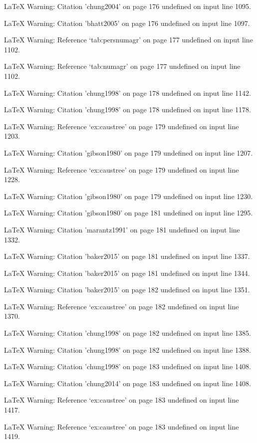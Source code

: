 LaTeX Warning: Citation 'chung2004' on page 176 undefined on input line 1095.


LaTeX Warning: Citation 'bhatt2005' on page 176 undefined on input line 1097.


LaTeX Warning: Reference `tab:persnumagr' on page 177 undefined on input line 1102.


LaTeX Warning: Reference `tab:numagr' on page 177 undefined on input line 1102.


LaTeX Warning: Citation 'chung1998' on page 178 undefined on input line 1142.


LaTeX Warning: Citation 'chung1998' on page 178 undefined on input line 1178.


LaTeX Warning: Reference `ex:caustree' on page 179 undefined on input line 1203.


LaTeX Warning: Citation 'gibson1980' on page 179 undefined on input line 1207.


LaTeX Warning: Reference `ex:caustree' on page 179 undefined on input line 1228.


LaTeX Warning: Citation 'gibson1980' on page 179 undefined on input line 1230.


LaTeX Warning: Citation 'gibson1980' on page 181 undefined on input line 1295.


LaTeX Warning: Citation 'marantz1991' on page 181 undefined on input line 1332.


LaTeX Warning: Citation 'baker2015' on page 181 undefined on input line 1337.


LaTeX Warning: Citation 'baker2015' on page 181 undefined on input line 1344.


LaTeX Warning: Citation 'baker2015' on page 182 undefined on input line 1351.


LaTeX Warning: Reference `ex:caustree' on page 182 undefined on input line 1370.


LaTeX Warning: Citation 'chung1998' on page 182 undefined on input line 1385.


LaTeX Warning: Citation 'chung1998' on page 182 undefined on input line 1388.


LaTeX Warning: Citation 'chung1998' on page 183 undefined on input line 1408.


LaTeX Warning: Citation 'chung2014' on page 183 undefined on input line 1408.


LaTeX Warning: Reference `ex:caustree' on page 183 undefined on input line 1417.


LaTeX Warning: Reference `ex:caustree' on page 183 undefined on input line 1419.



